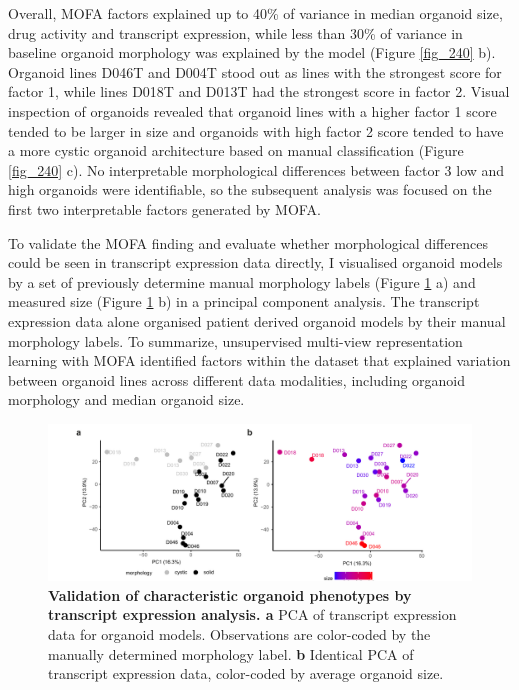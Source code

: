 \begin{flushleft}
Overall, MOFA factors explained up to 40\% of variance in median organoid size, drug activity and transcript expression, while less than 30\% of variance in baseline organoid morphology was explained by the model (Figure \ref{fig_240} b). Organoid lines D046T and D004T stood out as lines with the strongest score for factor 1, while lines D018T and D013T had the strongest score in factor 2. Visual inspection of organoids revealed that organoid lines with a higher factor 1 score tended to be larger in size and organoids with high factor 2 score tended to have a more cystic organoid architecture based on manual classification (Figure \ref{fig_240} c). No interpretable morphological differences between factor 3 low and high organoids were identifiable, so the subsequent analysis was focused on the first two interpretable factors generated by MOFA. 
\bigbreak

To validate the MOFA finding and evaluate whether morphological differences could be seen in transcript expression data directly, I visualised organoid models by a set of previously determine manual morphology labels (Figure \ref{fig_241} a) and measured size (Figure \ref{fig_241} b) in a principal component analysis. The transcript expression data alone organised patient derived organoid models by their manual morphology labels. To summarize, unsupervised multi-view representation learning with MOFA identified factors within the dataset that explained variation between organoid lines across different data modalities, including organoid morphology and median organoid size.

\begin{figure}[!h]
\centering
\includegraphics[width=500pt,
                height=\textheight,
                keepaspectratio]{figures/promise/pdf/fig_4_1.pdf}
\caption[Validation of characteristic organoid phenotypes by transcript expression analysis]{\textbf{Validation of characteristic organoid phenotypes by transcript expression analysis. a} PCA of transcript expression data for organoid models. Observations are color-coded by the manually determined morphology label. \textbf{b} Identical PCA of transcript expression data, color-coded by average organoid size.}
\label{fig_241}
\end{figure}



\end{flushleft}

